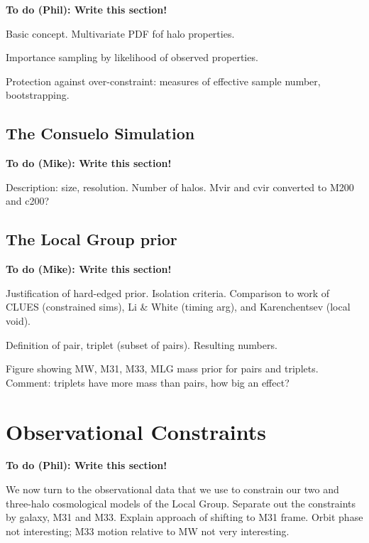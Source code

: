 \documentclass{emulateapj}
\newcommand{\consuelo}{{\sc Consuelo }}
\newcommand{\todo}[2]{{\bf To do (#1): #2}}
\begin{document}
\todo{Phil}{Write this section!}

Basic concept. Multivariate PDF fof halo properties.

Importance sampling by likelihood of observed properties.

Protection against over-constraint: measures of effective sample number,
bootstrapping.


\subsection{The \consuelo Simulation}
\label{sec:sampling}

\todo{Mike}{Write this section!}

Description: size, resolution. Number of halos. Mvir and cvir converted to M200
and c200?



\subsection{The Local Group prior}
\label{sec:sampling}

\todo{Mike}{Write this section!}

Justification of hard-edged prior. Isolation criteria. Comparison to work of
CLUES (constrained sims), Li \& White (timing arg), and Karenchentsev (local
void). 

Definition of pair, triplet (subset of pairs). Resulting numbers. 

Figure showing MW, M31, M33, MLG mass prior for pairs and triplets. Comment:
triplets have more mass than pairs, how big an effect?


\section{Observational Constraints}
\label{sec:data}

\todo{Phil}{Write this section!}

We now turn to the observational data that we use to constrain our two and
three-halo cosmological models of the Local Group. Separate out
the constraints by galaxy, M31 and M33.  Explain approach of shifting to M31
frame. Orbit phase not interesting; M33 motion relative to MW not very
interesting.
\end{document}
